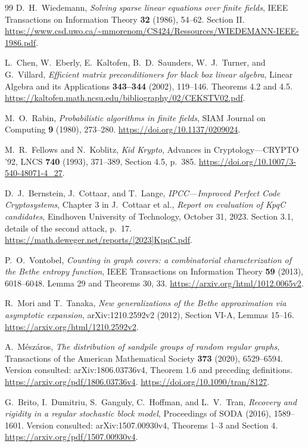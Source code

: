 \documentclass[11pt]{article}
\theoremstyle{definition}
\theoremstyle{remark}
\newcommand{\1}{\mathbf 1}
\begin{document}
\begin{thebibliography}{99}
D.~H.~Wiedemann, \emph{Solving sparse linear equations over finite fields},
IEEE Transactions on Information Theory \textbf{32} (1986), 54--62.
Section II.
\url{https://www.csd.uwo.ca/~mmorenom/CS424/Ressources/WIEDEMANN-IEEE-1986.pdf}.

L.~Chen, W.~Eberly, E.~Kaltofen, B.~D.~Saunders, W.~J.~Turner,
and G.~Villard, \emph{Efficient matrix preconditioners for black box
linear algebra}, Linear Algebra and its Applications \textbf{343--344}
(2002), 119--146. Theorems 4.2 and 4.5.
\url{https://kaltofen.math.ncsu.edu/bibliography/02/CEKSTV02.pdf}.

M.~O.~Rabin, \emph{Probabilistic algorithms in finite fields},
SIAM Journal on Computing \textbf{9} (1980), 273--280.
\url{https://doi.org/10.1137/0209024}.

M.~R.~Fellows and N.~Koblitz, \emph{Kid Krypto},
Advances in Cryptology---CRYPTO '92, LNCS \textbf{740} (1993),
371--389, Section 4.5, p.~385.
\url{https://doi.org/10.1007/3-540-48071-4_27}.

D.~J.~Bernstein, J.~Cottaar, and T.~Lange,
\emph{IPCC---Improved Perfect Code Cryptosystems}, Chapter 3 in
J.~Cottaar et al., \emph{Report on evaluation of KpqC candidates},
Eindhoven University of Technology, October 31, 2023.
Section 3.1, details of the second attack, p.~17.
\url{https://math.deweger.net/reports/[2023]KpqC.pdf}.

P.~O.~Vontobel, \emph{Counting in graph covers: a combinatorial
characterization of the Bethe entropy function},
IEEE Transactions on Information Theory \textbf{59} (2013), 6018--6048.
Lemma 29 and Theorems 30, 33.
\url{https://arxiv.org/html/1012.0065v2}.

R.~Mori and T.~Tanaka, \emph{New generalizations of the Bethe approximation
via asymptotic expansion}, arXiv:1210.2592v2 (2012), Section VI-A,
Lemmas 15--16. \url{https://arxiv.org/html/1210.2592v2}.

A.~M\'esz\'aros, \emph{The distribution of sandpile groups of random
regular graphs}, Transactions of the American Mathematical Society
\textbf{373} (2020), 6529--6594.
Version consulted: arXiv:1806.03736v4, Theorem 1.6 and preceding definitions.
\url{https://arxiv.org/pdf/1806.03736v4}.
\url{https://doi.org/10.1090/tran/8127}.

G.~Brito, I.~Dumitriu, S.~Ganguly, C.~Hoffman, and L.~V.~Tran,
\emph{Recovery and rigidity in a regular stochastic block model},
Proceedings of SODA (2016), 1589--1601.
Version consulted: arXiv:1507.00930v4, Theorems 1--3 and Section 4.
\url{https://arxiv.org/pdf/1507.00930v4}.


\end{thebibliography}
\end{document}
